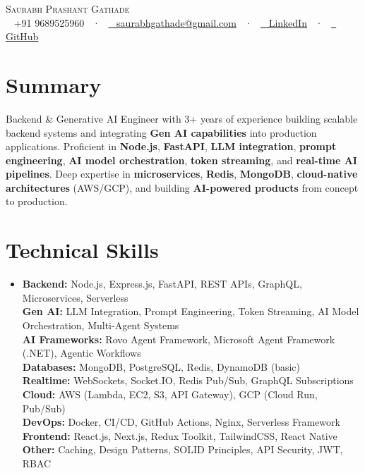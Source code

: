 \documentclass[letterpaper,11pt]{article}
\newcommand{\resumeSubHeadingListStart}{\begin{itemize}[leftmargin=0in,label={}]}
\newcommand{\resumeSubHeadingListEnd}{\end{itemize}}
\begin{document}
\begin{center}
{\Huge \scshape Saurabh Prashant Gathade} \\ \vspace{4pt}
\small
\faPhone~ +91 9689525960 ~·~
\href{mailto:saurabhgathade@gmail.com}{\faEnvelope~ saurabhgathade@gmail.com} ~·~
\href{https://www.linkedin.com/in/saurabhpgathade}{\faLinkedin~ LinkedIn} ~·~
\href{https://github.com/Saurabhgathade131}{\faGithub~ GitHub}
\end{center}

\section{Summary}
\small Backend \& Generative AI Engineer with 3+ years of experience building scalable backend systems and integrating \textbf{Gen AI capabilities} into production applications. Proficient in \textbf{Node.js}, \textbf{FastAPI}, \textbf{LLM integration}, \textbf{prompt engineering}, \textbf{AI model orchestration}, \textbf{token streaming}, and \textbf{real-time AI pipelines}. Deep expertise in \textbf{microservices}, \textbf{Redis}, \textbf{MongoDB}, \textbf{cloud-native architectures} (AWS/GCP), and building \textbf{AI-powered products} from concept to production.

\section{Technical Skills}
\resumeSubHeadingListStart
\item\small{
\textbf{Backend:} Node.js, Express.js, FastAPI, REST APIs, GraphQL, Microservices, Serverless \\
\textbf{Gen AI:} LLM Integration, Prompt Engineering, Token Streaming, AI Model Orchestration, Multi-Agent Systems \\
\textbf{AI Frameworks:} Rovo Agent Framework, Microsoft Agent Framework (.NET), Agentic Workflows \\
\textbf{Databases:} MongoDB, PostgreSQL, Redis, DynamoDB (basic) \\
\textbf{Realtime:} WebSockets, Socket.IO, Redis Pub/Sub, GraphQL Subscriptions \\
\textbf{Cloud:} AWS (Lambda, EC2, S3, API Gateway), GCP (Cloud Run, Pub/Sub) \\
\textbf{DevOps:} Docker, CI/CD, GitHub Actions, Nginx, Serverless Framework \\
\textbf{Frontend:} React.js, Next.js, Redux Toolkit, TailwindCSS, React Native \\
\textbf{Other:} Caching, Design Patterns, SOLID Principles, API Security, JWT, RBAC
}
\resumeSubHeadingListEnd
\vspace{-10pt}
\end{document}
